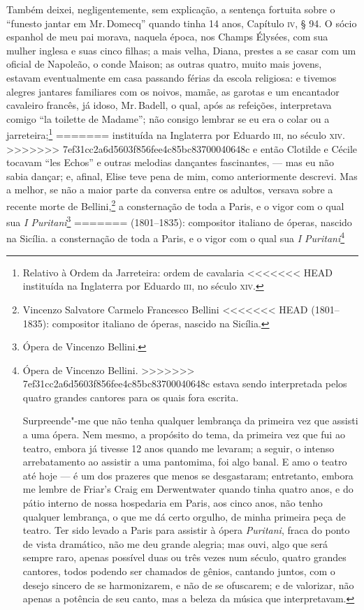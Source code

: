 {{{{{{{{{{{{{{{{{{{{{{{{{{{{{{{{{{{{{{{{{{{{{{{{{{{{{{{{{{{{{{{{{{{{{{{{{%
Também deixei, negligentemente, sem explicação, a sentença fortuita
sobre o ``funesto jantar em Mr.\,Domecq'' quando tinha 14 anos, Capítulo
\textsc{iv}, § 94. O sócio espanhol de meu pai morava, naquela época, nos Champs \label{201}
Élysées, com sua mulher inglesa e suas cinco filhas; a mais velha,
Diana, prestes a se casar com um oficial de Napoleão, o conde Maison; as
outras quatro, muito mais jovens, estavam eventualmente em casa passando
férias da escola religiosa: e tivemos alegres jantares familiares com os
noivos, mamãe, as garotas e um encantador cavaleiro francês, já idoso,
Mr.\,Badell, o qual, após as refeições, interpretava comigo ``la toilette
de Madame''; não consigo lembrar se eu era o colar ou a
jarreteira;\footnote{Relativo à Ordem da Jarreteira: ordem de cavalaria
<<<<<<< HEAD
  instituída na Inglaterra por Eduardo \textsc{iii}, no século \textsc{xiv}.}
=======
  instituída na Inglaterra por Eduardo \textsc{iii}, no século \textsc{xiv}. 
>>>>>>> 7ef31cc2a6d5603f856fee4c85bc83700040648c
e então Clotilde e Cécile tocavam ``les Echos'' e outras melodias
dançantes fascinantes, --- mas eu não sabia dançar; e, afinal, Elise teve
pena de mim, como anteriormente descrevi. Mas a melhor, se não a maior
parte da conversa entre os adultos, versava sobre a recente morte de
Bellini,\footnote{Vincenzo Salvatore Carmelo Francesco Bellini
<<<<<<< HEAD
  (1801--1835): compositor italiano de óperas, nascido na Sicília.} a consternação de toda a Paris, e o vigor com o qual sua
\textit{I Puritani}\footnote{Ópera de Vincenzo Bellini.}
=======
  (1801--1835): compositor italiano de óperas, nascido na Sicília.  a consternação de toda a Paris, e o vigor com o qual sua
\textit{I Puritani}\footnote{Ópera de Vincenzo Bellini. 
>>>>>>> 7ef31cc2a6d5603f856fee4c85bc83700040648c
estava sendo interpretada pelos quatro grandes cantores para os quais
fora escrita.

Surpreende"-me que não tenha qualquer lembrança da primeira vez que
assisti a uma ópera. Nem mesmo, a propósito do tema, da primeira vez que
fui ao teatro, embora já tivesse 12 anos quando me levaram; a seguir, o
intenso arrebatamento ao assistir a uma pantomima, foi algo banal. E amo
o teatro até hoje --- é um dos prazeres que menos se desgastaram;
entretanto, embora me lembre de Friar's Craig em Derwentwater quando
tinha quatro anos, e do pátio interno de nossa hospedaria em Paris, aos
cinco anos, não tenho qualquer lembrança, o que me dá certo orgulho, de
minha primeira peça de teatro. Ter sido levado a Paris para assistir à
ópera \textit{Puritani}, fraca do ponto de vista dramático, não me deu
grande alegria; mas ouvi, algo que será sempre raro, apenas possível
duas ou três vezes num século, quatro grandes cantores, todos podendo
ser chamados de gênios, cantando juntos, com o desejo sincero de se
harmonizarem, e não de se ofuscarem; e de valorizar, não apenas a
potência de seu canto, mas a beleza da música que interpretavam.

}}}}}}}}}}}}}}}}}}}}}}}}}}}}}}}}}}}}}}}}}}}}}}}}}}}}}}}}}}}}}}}}}}}}}}}}}}
